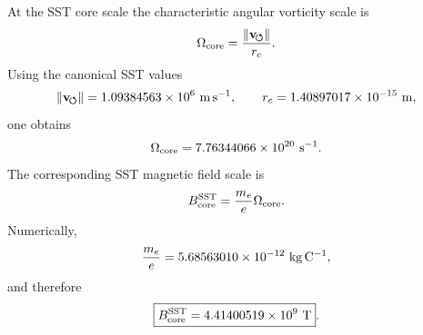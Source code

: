     At the SST core scale the characteristic angular vorticity scale is
    \begin{equation}
        \Omega_{\rm core}
        =
        \frac{\lVert\mathbf{v}_{\!\boldsymbol{\circlearrowleft}}\rVert}{r_c}.
        \label{eq:omega_core}
    \end{equation}
    Using the canonical SST values
    \begin{equation}
        \lVert\mathbf{v}_{\!\boldsymbol{\circlearrowleft}}\rVert
        =
        1.09384563\times10^{6}\ {\rm m\,s^{-1}},
        \qquad
        r_c
        =
        1.40897017\times10^{-15}\ {\rm m},
    \end{equation}
    one obtains
    \begin{equation}
        \Omega_{\rm core}
        =
        7.76344066\times10^{20}\ {\rm s^{-1}}.
        \label{eq:omega_core_numeric}
    \end{equation}
    The corresponding SST magnetic field scale is
    \begin{equation}
        B_{\rm core}^{\rm SST}
        =
        \frac{m_e}{e}\Omega_{\rm core}.
        \label{eq:Bcore_sst}
    \end{equation}
    Numerically,
    \begin{equation}
        \frac{m_e}{e}
        =
        5.68563010\times10^{-12}\ {\rm kg\,C^{-1}},
    \end{equation}
    and therefore
    \begin{equation}
        \boxed{
            B_{\rm core}^{\rm SST}
            =
            4.41400519\times10^{9}\ {\rm T}
        } .
        \label{eq:Bcore_numeric}
    \end{equation}
    
